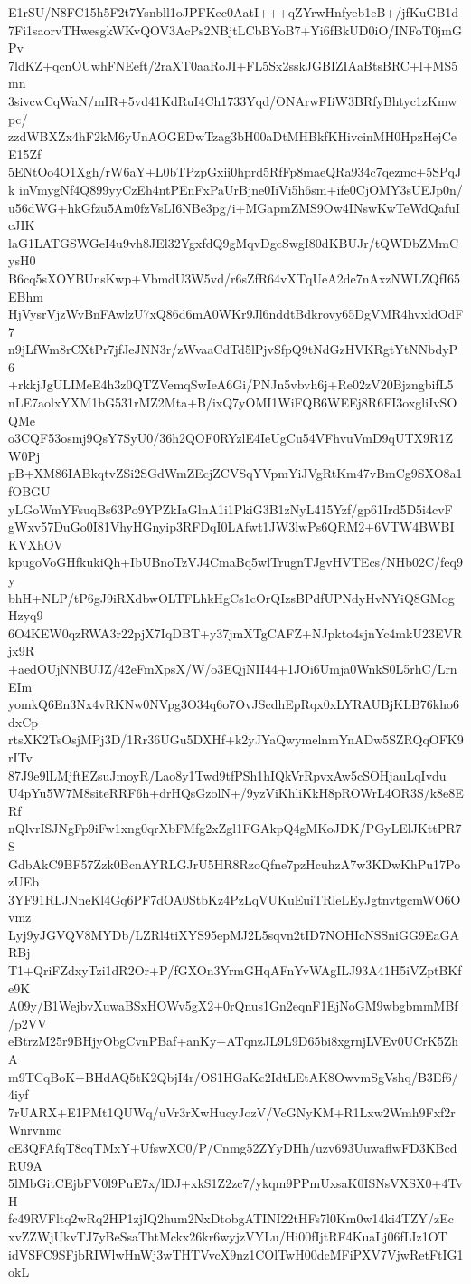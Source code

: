 E1rSU/N8FC15h5F2t7Ysnbll1oJPFKec0AatI+++qZYrwHnfyeb1eB+/jfKuGB1d
7Fi1saorvTHwesgkWKvQOV3AcPs2NBjtLCbBYoB7+Yi6fBkUD0iO/INFoT0jmGPv
7ldKZ+qcnOUwhFNEeft/2raXT0aaRoJI+FL5Sx2sskJGBIZIAaBtsBRC+l+MS5mn
3sivcwCqWaN/mIR+5vd41KdRuI4Ch1733Yqd/ONArwFIiW3BRfyBhtyc1zKmwpc/
zzdWBXZx4hF2kM6yUnAOGEDwTzag3bH00aDtMHBkfKHivcinMH0HpzHejCeE15Zf
5ENtOo4O1Xgh/rW6aY+L0bTPzpGxii0hprd5RfFp8maeQRa934c7qezmc+5SPqJk
inVmygNf4Q899yyCzEh4ntPEnFxPaUrBjne0IiVi5h6sm+ife0CjOMY3sUEJp0n/
u56dWG+hkGfzu5Am0fzVsLI6NBe3pg/i+MGapmZMS9Ow4INswKwTeWdQafuIcJIK
laG1LATGSWGeI4u9vh8JEl32YgxfdQ9gMqvDgcSwgI80dKBUJr/tQWDbZMmCysH0
B6cq5sXOYBUnsKwp+VbmdU3W5vd/r6sZfR64vXTqUeA2de7nAxzNWLZQfI65EBhm
HjVysrVjzWvBnFAwlzU7xQ86d6mA0WKr9Jl6nddtBdkrovy65DgVMR4hvxldOdF7
n9jLfWm8rCXtPr7jfJeJNN3r/zWvaaCdTd5lPjvSfpQ9tNdGzHVKRgtYtNNbdyP6
+rkkjJgULIMeE4h3z0QTZVemqSwIeA6Gi/PNJn5vbvh6j+Re02zV20BjzngbifL5
nLE7aolxYXM1bG531rMZ2Mta+B/ixQ7yOMI1WiFQB6WEEj8R6FI3oxgliIvSOQMe
o3CQF53osmj9QsY7SyU0/36h2QOF0RYzlE4IeUgCu54VFhvuVmD9qUTX9R1ZW0Pj
pB+XM86IABkqtvZSi2SGdWmZEcjZCVSqYVpmYiJVgRtKm47vBmCg9SXO8a1fOBGU
yLGoWmYFsuqBs63Po9YPZkIaGlnA1i1PkiG3B1zNyL415Yzf/gp61Ird5D5i4cvF
gWxv57DuGo0I81VhyHGnyip3RFDqI0LAfwt1JW3lwPs6QRM2+6VTW4BWBIKVXhOV
kpugoVoGHfkukiQh+IbUBnoTzVJ4CmaBq5wlTrugnTJgvHVTEcs/NHb02C/feq9y
bhH+NLP/tP6gJ9iRXdbwOLTFLhkHgCs1cOrQIzsBPdfUPNdyHvNYiQ8GMogHzyq9
6O4KEW0qzRWA3r22pjX7IqDBT+y37jmXTgCAFZ+NJpkto4sjnYc4mkU23EVRjx9R
+aedOUjNNBUJZ/42eFmXpsX/W/o3EQjNII44+1JOi6Umja0WnkS0L5rhC/LrnEIm
yomkQ6En3Nx4vRKNw0NVpg3O34q6o7OvJScdhEpRqx0xLYRAUBjKLB76kho6dxCp
rtsXK2TsOsjMPj3D/1Rr36UGu5DXHf+k2yJYaQwymelnmYnADw5SZRQqOFK9rITv
87J9e9lLMjftEZsuJmoyR/Lao8y1Twd9tfPSh1hIQkVrRpvxAw5cSOHjauLqIvdu
U4pYu5W7M8siteRRF6h+drHQsGzolN+/9yzViKhliKkH8pROWrL4OR3S/k8e8ERf
nQlvrISJNgFp9iFw1xng0qrXbFMfg2xZgl1FGAkpQ4gMKoJDK/PGyLElJKttPR7S
GdbAkC9BF57Zzk0BcnAYRLGJrU5HR8RzoQfne7pzHcuhzA7w3KDwKhPu17PozUEb
3YF91RLJNneKl4Gq6PF7dOA0StbKz4PzLqVUKuEuiTRleLEyJgtnvtgcmWO6Ovmz
Lyj9yJGVQV8MYDb/LZRl4tiXYS95epMJ2L5sqvn2tID7NOHIcNSSniGG9EaGARBj
T1+QriFZdxyTzi1dR2Or+P/fGXOn3YrmGHqAFnYvWAgILJ93A41H5iVZptBKfe9K
A09y/B1WejbvXuwaBSxHOWv5gX2+0rQnus1Gn2eqnF1EjNoGM9wbgbmmMBf/p2VV
eBtrzM25r9BHjyObgCvnPBaf+anKy+ATqnzJL9L9D65bi8xgrnjLVEv0UCrK5ZhA
m9TCqBoK+BHdAQ5tK2QbjI4r/OS1HGaKc2IdtLEtAK8OwvmSgVshq/B3Ef6/4iyf
7rUARX+E1PMt1QUWq/uVr3rXwHucyJozV/VcGNyKM+R1Lxw2Wmh9Fxf2rWnrvnmc
cE3QFAfqT8cqTMxY+UfswXC0/P/Cnmg52ZYyDHh/uzv693UuwaflwFD3KBcdRU9A
5lMbGitCEjbFV0l9PuE7x/lDJ+xkS1Z2zc7/ykqm9PPmUxsaK0ISNsVXSX0+4TvH
fc49RVFltq2wRq2HP1zjIQ2hum2NxDtobgATINI22tHFs7l0Km0w14ki4TZY/zEc
xvZZWjUkvTJ7yBeSsaThtMckx26kr6wyjzVYLu/Hi00fIjtRF4KuaLj06fLIz1OT
idVSFC9SFjbRIWlwHnWj3wTHTVvcX9nz1COlTwH00dcMFiPXV7VjwRetFtIG1okL
